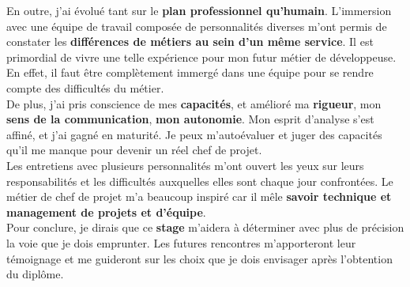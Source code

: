 En outre, j’ai évolué tant sur le \textbf{plan professionnel qu’humain}. L’immersion avec une équipe de travail composée de personnalités diverses m’ont permis de constater les \textbf{différences de métiers au sein d’un même service}. Il est primordial de vivre une telle expérience pour mon futur métier de développeuse. En effet, il faut être complètement immergé dans une équipe pour se rendre compte des difficultés du métier.\\

De plus, j’ai pris conscience de mes \textbf{capacités}, et amélioré ma \textbf{rigueur}, mon \textbf{sens de la communication}, \textbf{mon autonomie}. Mon esprit d’analyse s’est affiné, et j’ai gagné en maturité. Je peux m’autoévaluer et juger des capacités qu’il me manque pour devenir un réel chef de projet.\\

Les entretiens avec plusieurs personnalités m’ont ouvert les yeux sur leurs responsabilités et les difficultés auxquelles elles sont chaque jour confrontées. Le métier de chef de projet m’a beaucoup inspiré car il mêle \textbf{savoir technique et management de projets et d’équipe}.\\
 
Pour conclure, je dirais que ce \textbf{stage} m’aidera à déterminer avec plus de précision la voie que je dois emprunter. Les futures rencontres m’apporteront leur témoignage et me guideront sur les choix que je dois envisager après l’obtention du diplôme.\\

\listoffigures %
